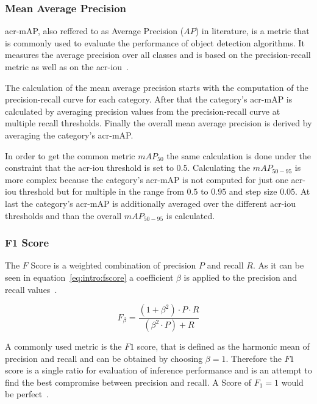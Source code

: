 \subsubsection*{Mean Average Precision}

\gls{acr-mAP}, also reffered to as Average Precision ($AP$) in literature, is a metric that is commonly 
used to evaluate the performance of object detection algorithms. It measures the average precision 
over all classes and is based on the precision-recall metric as well as on the
\gls{acr-iou}~\cite{terven2023}.

The calculation of the mean average precision starts with the computation of the precision-recall 
curve for each category. After that the category's \gls{acr-mAP} is calculated by averaging precision 
values from the precision-recall curve at multiple recall thresholds. Finally the overall mean average 
precision is derived by averaging the category's \gls{acr-mAP}. 

In order to get the common metric $mAP_{50}$ the same calculation is done under the 
constraint that the \gls{acr-iou} threshold is set to $0.5$. Calculating the $mAP_{50-95}$ is more 
complex because the category's \gls{acr-mAP} is not computed for just one \gls{acr-iou} threshold 
but for multiple in the range from $0.5$ to $0.95$ and step size $0.05$. At last the category's 
\gls{acr-mAP} is additionally averaged over the different \gls{acr-iou} thresholds and than the overall 
$mAP_{50-95}$ is calculated.

\subsubsection*{F1 Score}

The $F$ Score is a weighted combination of precision $P$ and recall $R$. As it can be seen in 
equation~\ref{eq:intro:fscore} a coefficient $\beta$ is applied to the precision and recall 
values~\cite{chaar2005, goutte2005, skopal2005}. 

\begin{equation}
	\label{eq:intro:fscore}
	F_\beta = \frac{(1 + \beta^2) \cdot P \cdot R}{(\beta^2 \cdot P) + R}
\end{equation} 

A commonly used metric is the $F1$ score, that is defined as the harmonic mean of precision and 
recall and can be obtained by choosing $\beta = 1$. Therefore the $F1$ score is a single ratio for 
evaluation of inference performance and is an attempt to find the best compromise between 
precision and recall. A Score of $F_1 = 1$ would be perfect~\cite{skopal2005}.

